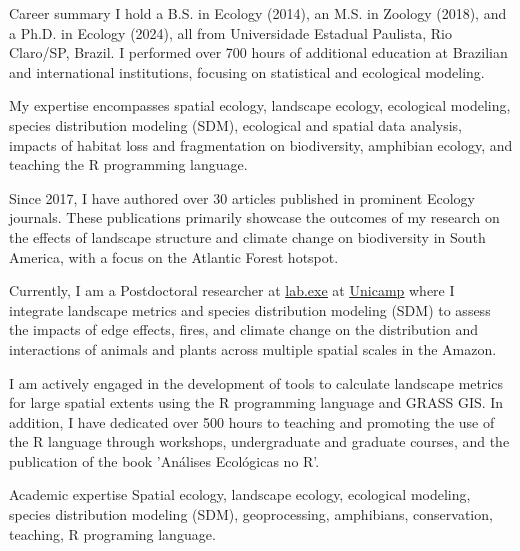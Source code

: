 \documentclass{resume}
\begin{document}

\begin{rSection}{Career summary}
I hold a B.S. in Ecology (2014), an M.S. in Zoology (2018), and a Ph.D. in Ecology (2024), all from Universidade Estadual Paulista, Rio Claro/SP, Brazil. I performed over 700 hours of additional education at Brazilian and international institutions, focusing on statistical and ecological modeling. 

My expertise encompasses spatial ecology, landscape ecology, ecological modeling, species distribution modeling (SDM), ecological and spatial data analysis, impacts of habitat loss and fragmentation on biodiversity, amphibian ecology, and teaching the R programming language. 

Since 2017, I have authored over 30 articles published in prominent Ecology journals. These publications primarily showcase the outcomes of my research on the effects of landscape structure and climate change on biodiversity in South America, with a focus on the Atlantic Forest hotspot.

Currently, I am a Postdoctoral researcher at \href{https://www.mathiasmpires.net.br/index.html}{\underline{lab.exe}} at \href{https://unicamp.br/}{\underline{Unicamp}} where I integrate landscape metrics and species distribution modeling (SDM) to assess the impacts of edge effects, fires, and climate change on the distribution and interactions of animals and plants across multiple spatial scales in the Amazon.

I am actively engaged in the development of tools to calculate landscape metrics for large spatial extents using the R programming language and GRASS GIS. In addition, I have dedicated over 500 hours to teaching and promoting the use of the R language through workshops, undergraduate and graduate courses, and the publication of the book 'Análises Ecológicas no R'.
\end{rSection}


\begin{rSection}{Academic expertise}
Spatial ecology, landscape ecology, ecological modeling, species distribution modeling (SDM), geoprocessing, amphibians, conservation, teaching, R programing language.
\end{rSection}
\end{document}
